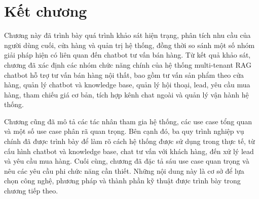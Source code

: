 \documentclass[../DoAn.tex]{subfiles}
\begin{document}
\section*{Kết chương}

Chương này đã trình bày quá trình khảo sát hiện trạng, phân tích nhu cầu của người dùng cuối, cửa hàng và quản trị hệ thống, đồng thời so sánh một số nhóm giải pháp hiện có liên quan đến chatbot tư vấn bán hàng. Từ kết quả khảo sát, chương đã xác định các nhóm chức năng chính của hệ thống multi-tenant RAG chatbot hỗ trợ tư vấn bán hàng nội thất, bao gồm tư vấn sản phẩm theo cửa hàng, quản lý chatbot và knowledge base, quản lý hội thoại, lead, yêu cầu mua hàng, tham chiếu giá cơ bản, tích hợp kênh chat ngoài và quản lý vận hành hệ thống.

Chương cũng đã mô tả các tác nhân tham gia hệ thống, các use case tổng quan và một số use case phân rã quan trọng. Bên cạnh đó, ba quy trình nghiệp vụ chính đã được trình bày để làm rõ cách hệ thống được sử dụng trong thực tế, từ cấu hình chatbot và knowledge base, chat tư vấn với khách hàng, đến xử lý lead và yêu cầu mua hàng. Cuối cùng, chương đã đặc tả sáu use case quan trọng và nêu các yêu cầu phi chức năng cần thiết. Những nội dung này là cơ sở để lựa chọn công nghệ, phương pháp và thành phần kỹ thuật được trình bày trong chương tiếp theo.
\end{document}
